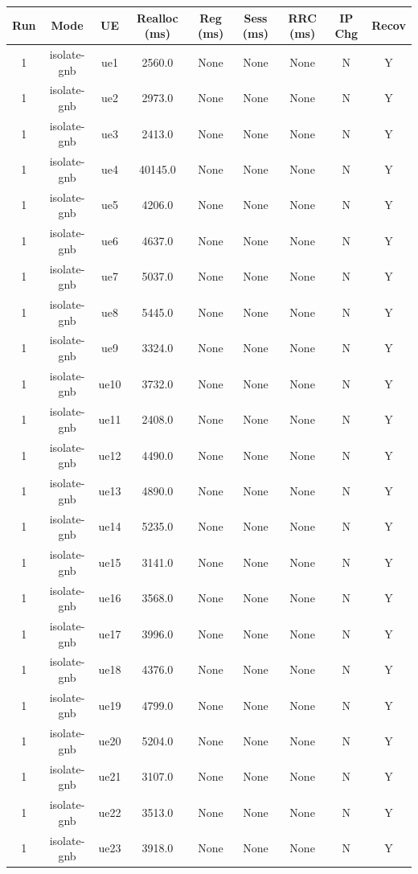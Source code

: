\begin{table}[ht]
\centering
\begin{tabular}{|c|c|c|c|c|c|c|c|c|}
\hline
Run & Mode & UE & Realloc (ms) & Reg (ms) & Sess (ms) & RRC (ms) & IP Chg & Recov \\
\hline
1 & isolate-gnb & ue1 & 2560.0 & None & None & None & N & Y \\
1 & isolate-gnb & ue2 & 2973.0 & None & None & None & N & Y \\
1 & isolate-gnb & ue3 & 2413.0 & None & None & None & N & Y \\
1 & isolate-gnb & ue4 & 40145.0 & None & None & None & N & Y \\
1 & isolate-gnb & ue5 & 4206.0 & None & None & None & N & Y \\
1 & isolate-gnb & ue6 & 4637.0 & None & None & None & N & Y \\
1 & isolate-gnb & ue7 & 5037.0 & None & None & None & N & Y \\
1 & isolate-gnb & ue8 & 5445.0 & None & None & None & N & Y \\
1 & isolate-gnb & ue9 & 3324.0 & None & None & None & N & Y \\
1 & isolate-gnb & ue10 & 3732.0 & None & None & None & N & Y \\
1 & isolate-gnb & ue11 & 2408.0 & None & None & None & N & Y \\
1 & isolate-gnb & ue12 & 4490.0 & None & None & None & N & Y \\
1 & isolate-gnb & ue13 & 4890.0 & None & None & None & N & Y \\
1 & isolate-gnb & ue14 & 5235.0 & None & None & None & N & Y \\
1 & isolate-gnb & ue15 & 3141.0 & None & None & None & N & Y \\
1 & isolate-gnb & ue16 & 3568.0 & None & None & None & N & Y \\
1 & isolate-gnb & ue17 & 3996.0 & None & None & None & N & Y \\
1 & isolate-gnb & ue18 & 4376.0 & None & None & None & N & Y \\
1 & isolate-gnb & ue19 & 4799.0 & None & None & None & N & Y \\
1 & isolate-gnb & ue20 & 5204.0 & None & None & None & N & Y \\
1 & isolate-gnb & ue21 & 3107.0 & None & None & None & N & Y \\
1 & isolate-gnb & ue22 & 3513.0 & None & None & None & N & Y \\
1 & isolate-gnb & ue23 & 3918.0 & None & None & None & N & Y \\

\end{tabular}
\end{table}
